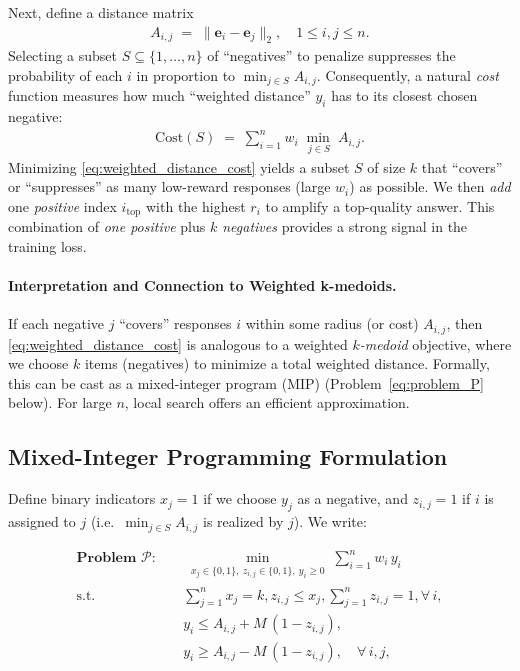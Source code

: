 Next, define a distance matrix 
\begin{align}
\label{eq:distance_matrix}
  A_{i,j} \;=\;
  \bigl\|\mathbf{e}_i - \mathbf{e}_j\bigr\|_2,
  \quad
  1 \le i,j \le n.
\end{align}
Selecting a subset $S\subseteq \{1,\dots,n\}$ of “negatives” to penalize suppresses the probability of each $i$ in proportion to $\min_{j \in S} A_{i,j}$. Consequently, a natural \emph{cost} function measures how much “weighted distance” $y_i$ has to its closest chosen negative:
\begin{align}
\label{eq:weighted_distance_cost}
    \text{Cost}(S)
    \;=\;
    \sum_{i=1}^n 
    w_i 
    \;\min_{\,j \in S}\;
    A_{i,j}.
\end{align}
Minimizing \eqref{eq:weighted_distance_cost} yields a subset $S$ of size $k$ that “covers” or “suppresses” as many low-reward responses (large $w_i$) as possible. We then \emph{add} one \emph{positive} index $i_{\mathrm{top}}$ with the highest $r_i$ to amplify a top-quality answer. This combination of \emph{one positive} plus \emph{$k$ negatives} provides a strong signal in the training loss.

\paragraph{Interpretation and Connection to Weighted k-medoids.}
If each negative $j$ “covers” responses $i$ within some radius (or cost) $A_{i,j}$, then \eqref{eq:weighted_distance_cost} is analogous to a weighted \emph{$k$-medoid} objective, where we choose $k$ items (negatives) to minimize a total weighted distance. Formally, this can be cast as a mixed-integer program (MIP) (Problem~\ref{eq:problem_P} below). For large $n$, local search offers an efficient approximation.

\subsection{Mixed-Integer Programming Formulation}

Define binary indicators $x_j = 1$ if we choose $y_j$ as a negative, and $z_{i,j} = 1$ if $i$ is assigned to $j$ (i.e.\ $\min_{j\in S} A_{i,j}$ is realized by $j$). We write:

\vspace{-0.15in}
\begin{align}
\label{eq:problem_P}
\textbf{Problem } \mathcal{P}: \quad
&\min_{\substack{x_j \in \{0,1\},\ z_{i,j}\in\{0,1\},\ y_i\ge 0}} 
 \sum_{i=1}^n w_i \,y_i 
\\
\text{s.t.}\quad
& \sum_{j=1}^n x_j = k, 
z_{i,j}\le x_j,
\sum_{j=1}^n z_{i,j} = 1, \forall\,i,\nonumber\\
& y_i \le A_{i,j} + M\,(1 - z_{i,j}), \nonumber\\
&y_i \ge A_{i,j} - M\,(1 - z_{i,j}),\quad\forall\,i,j,
\end{align}

